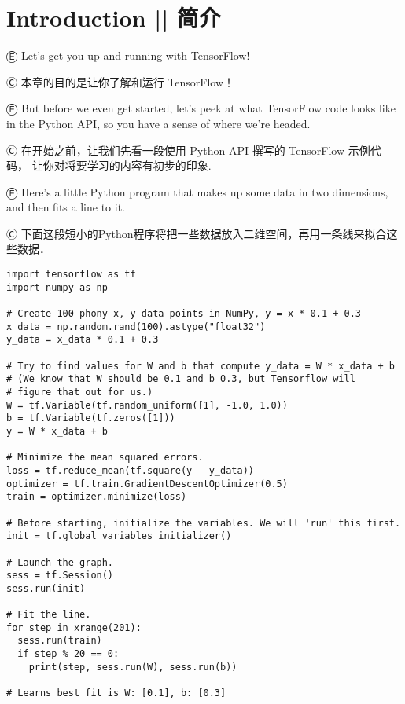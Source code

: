 

\section{Introduction  ||  简介}

Ⓔ \textcolor{etc}{Let's get you up and running with TensorFlow!}

Ⓒ 本章的目的是让你了解和运行 TensorFlow！

Ⓔ \textcolor{etc}{But before we even get started, let's peek at what TensorFlow code looks like in the Python API, so you have a sense of where we're headed.}

Ⓒ 在开始之前，让我们先看一段使用 Python API 撰写的 TensorFlow 示例代码，
让你对将要学习的内容有初步的印象.

Ⓔ \textcolor{etc}{Here's a little Python program that makes up some data in two dimensions, and then fits a line to it.}

Ⓒ 下面这段短小的Python程序将把一些数据放入二维空间，再用一条线来拟合这些数据．

\begin{lstlisting}
import tensorflow as tf
import numpy as np

# Create 100 phony x, y data points in NumPy, y = x * 0.1 + 0.3
x_data = np.random.rand(100).astype("float32")
y_data = x_data * 0.1 + 0.3

# Try to find values for W and b that compute y_data = W * x_data + b
# (We know that W should be 0.1 and b 0.3, but Tensorflow will
# figure that out for us.)
W = tf.Variable(tf.random_uniform([1], -1.0, 1.0))
b = tf.Variable(tf.zeros([1]))
y = W * x_data + b

# Minimize the mean squared errors.
loss = tf.reduce_mean(tf.square(y - y_data))
optimizer = tf.train.GradientDescentOptimizer(0.5)
train = optimizer.minimize(loss)

# Before starting, initialize the variables. We will 'run' this first.
init = tf.global_variables_initializer()

# Launch the graph.
sess = tf.Session()
sess.run(init)

# Fit the line.
for step in xrange(201):
  sess.run(train)
  if step % 20 == 0:
    print(step, sess.run(W), sess.run(b))

# Learns best fit is W: [0.1], b: [0.3]
\end{lstlisting}

